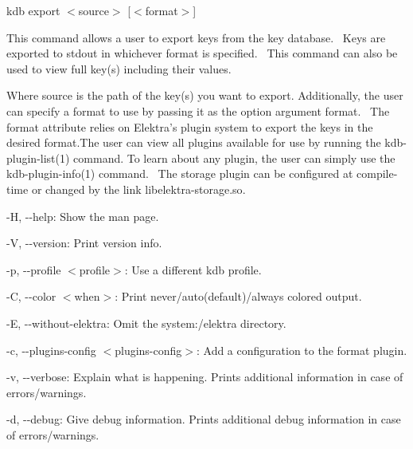 {\ttfamily kdb export $<$source$>$ \mbox{[}$<$format$>$\mbox{]}}~\newline


This command allows a user to export keys from the key database.~\newline
 Keys are exported to {\ttfamily stdout} in whichever format is specified.~\newline
 This command can also be used to view full key(s) including their values.~\newline


Where {\ttfamily source} is the path of the key(s) you want to export. Additionally, the user can specify a format to use by passing it as the option argument {\ttfamily format}.~\newline
 The {\ttfamily format} attribute relies on Elektra’s plugin system to export the keys in the desired format.\+The user can view all plugins available for use by running the kdb-\/plugin-\/list(1) command. To learn about any plugin, the user can simply use the kdb-\/plugin-\/info(1) command.~\newline
 The {\ttfamily storage} plugin can be configured at compile-\/time or changed by the link {\ttfamily libelektra-\/storage.\+so}.


\begin{DoxyItemize}
\item {\ttfamily -\/H}, {\ttfamily -\/-\/help}\+: Show the man page.
\item {\ttfamily -\/V}, {\ttfamily -\/-\/version}\+: Print version info.
\item {\ttfamily -\/p}, {\ttfamily -\/-\/profile $<$profile$>$}\+: Use a different kdb profile.
\item {\ttfamily -\/C}, {\ttfamily -\/-\/color $<$when$>$}\+: Print never/auto(default)/always colored output.
\item {\ttfamily -\/E}, {\ttfamily -\/-\/without-\/elektra}\+: Omit the {\ttfamily system\+:/elektra} directory.
\item {\ttfamily -\/c}, {\ttfamily -\/-\/plugins-\/config $<$plugins-\/config$>$}\+: Add a configuration to the format plugin.
\item {\ttfamily -\/v}, {\ttfamily -\/-\/verbose}\+: Explain what is happening. Prints additional information in case of errors/warnings.
\item {\ttfamily -\/d}, {\ttfamily -\/-\/debug}\+: Give debug information. Prints additional debug information in case of errors/warnings.
\end{DoxyItemize}


